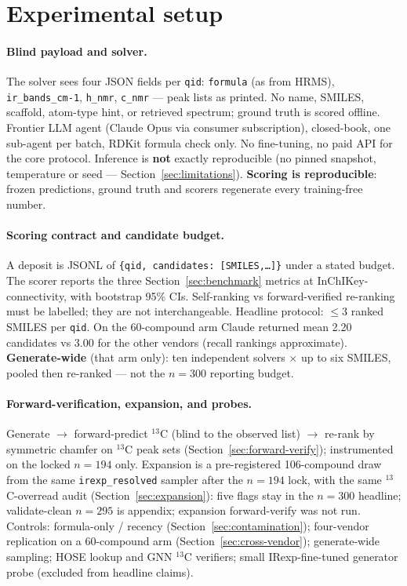 \documentclass{article}
\begin{document}
\section{Experimental setup}
\label{sec:setup}

\paragraph{Blind payload and solver.}
The solver sees four JSON fields per \texttt{qid}: \texttt{formula} (as from HRMS),
\texttt{ir\_bands\_cm-1}, \texttt{h\_nmr}, \texttt{c\_nmr} --- peak lists as printed.
No name, SMILES, scaffold, atom-type hint, or retrieved spectrum; ground truth is scored
offline.
Frontier LLM agent (Claude Opus via consumer subscription), closed-book, one sub-agent per
batch, RDKit formula check only.
No fine-tuning, no paid API for the core protocol.
Inference is \textbf{not} exactly reproducible (no pinned snapshot, temperature or seed ---
Section~\ref{sec:limitations}).
\textbf{Scoring is reproducible}: frozen predictions, ground truth and scorers regenerate every
training-free number.

\paragraph{Scoring contract and candidate budget.}
A deposit is JSONL of \texttt{\{qid, candidates: [SMILES,\ldots]\}} under a stated budget.
The scorer reports the three Section~\ref{sec:benchmark} metrics at InChIKey-connectivity,
with bootstrap 95\% CIs.
Self-ranking vs forward-verified re-ranking must be labelled; they are not interchangeable.
Headline protocol: $\leq$3 ranked SMILES per \texttt{qid}.
On the 60-compound arm Claude returned mean 2.20 candidates vs 3.00 for the other vendors
(recall rankings approximate).
\textbf{Generate-wide} (that arm only): ten independent solvers $\times$ up to six SMILES,
pooled then re-ranked --- not the $n{=}300$ reporting budget.

\paragraph{Forward-verification, expansion, and probes.}
Generate $\to$ forward-predict $^{13}$C (blind to the observed list) $\to$ re-rank by
symmetric chamfer on $^{13}$C peak sets (Section~\ref{sec:forward-verify}); instrumented on
the locked $n{=}194$ only.
Expansion is a pre-registered 106-compound draw from the same \texttt{irexp\_resolved}
sampler after the $n{=}194$ lock, with the same $^{13}$C-overread audit
(Section~\ref{sec:expansion}): five flags stay in the $n{=}300$ headline; validate-clean
$n{=}295$ is appendix; expansion forward-verify was not run.
Controls: formula-only / recency (Section~\ref{sec:contamination}); four-vendor replication
on a 60-compound arm (Section~\ref{sec:cross-vendor}); generate-wide sampling; HOSE lookup
and GNN $^{13}$C verifiers; small IRexp-fine-tuned generator probe (excluded from headline
claims).
\end{document}
